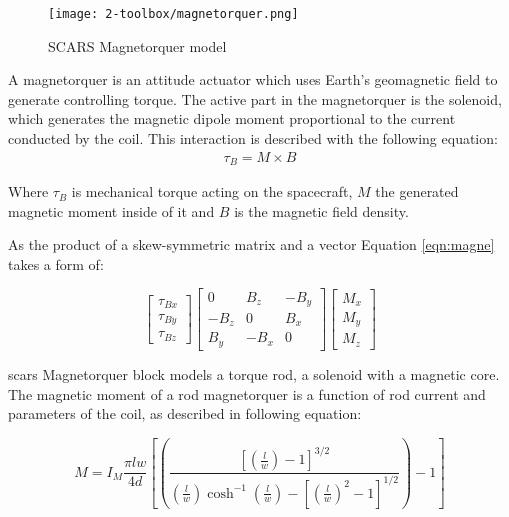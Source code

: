        \begin{figure}[h]
            \centering
            \texttt{[image: 2-toolbox/magnetorquer.png]}
            \caption{SCARS Magnetorquer model}
            \label{fig:magnetorquer}
        \end{figure}

        A magnetorquer is an attitude actuator which uses Earth's geomagnetic field to generate controlling torque. The active part in the magnetorquer is the solenoid, which generates the magnetic dipole moment proportional to the current conducted by the coil. This interaction is described with the following equation:
        \begin{align}
            \tau_B = M \times B\label{eqn:magne}
        \end{align}

        Where $\tau_B$ is mechanical torque acting on the spacecraft, $M$ the generated magnetic moment inside of it and $B$ is the magnetic field density. 
        
        As the product of a skew-symmetric matrix and a vector Equation \ref{eqn:magne} takes a form of:

        \begin{equation}
            \begin{bmatrix}
            \tau_{Bx}\\ 
            \tau_{By}\\ 
            \tau_{Bz}
            \end{bmatrix}
            \begin{bmatrix}
            0 & B_z & -B_y\\ 
            -B_z & 0 & B_x\\ 
            B_y & -B_x & 0
            \end{bmatrix}
            \begin{bmatrix}
            M_x\\
            M_y\\
            M_z
            \end{bmatrix}                
        \end{equation} %

        \ac{scars} Magnetorquer block models a torque rod, a solenoid with a magnetic core. The magnetic moment of a rod magnetorquer is a function of rod current and parameters of the coil, as described in following equation:

        \begin{equation}
            M = I_M\frac{\pi lw}{4d}\left[\left( \frac{\left[ \left( \frac{l}{w} \right) -1\right]^{3/2}}{\left( \frac{l}{w} \right)\cosh^{-1}\left( \frac{l}{w} \right)-\left[\left( \frac{l}{w} \right)^2 -1\right]^{1/2}} \right)- 1 \right]
        \end{equation}

